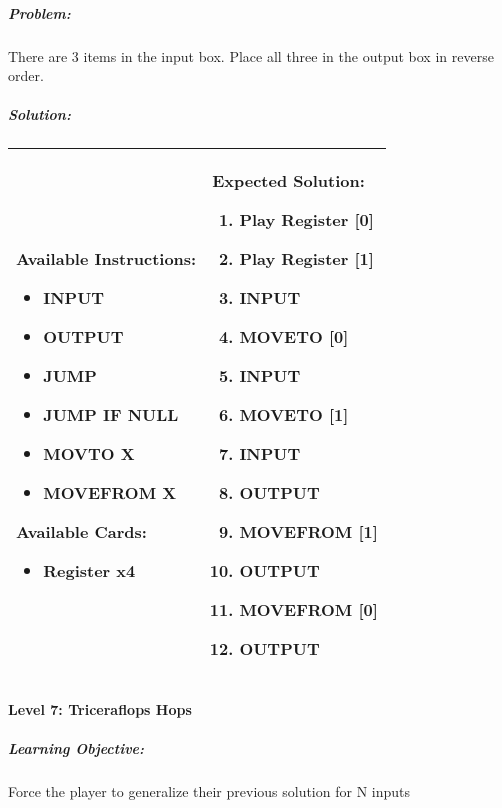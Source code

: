 \subparagraph{Problem:} There are 3 items in the input box. Place all three in the 
output box in reverse order.

\subparagraph{Solution:} 
\begin{center}
    \begin{tabular}{ | m{5cm} | m{9cm} | } 
        \hline
            \textbf{Available Instructions:} 
            \begin{itemize}
                \setlength\itemsep{-.35em}
                \item INPUT
                \item OUTPUT
                \item JUMP
                \item JUMP IF NULL
                \item MOVTO X
                \item MOVEFROM X
            \end{itemize}
            \textbf{Available Cards:} 
            \begin{itemize}
                \setlength\itemsep{-.35em}
                \item Register x4
            \end{itemize}& 
            \textbf{Expected Solution:} 
            \begin{enumerate}
                \setlength\itemsep{-.35em}
                \item Play Register [0]
                \item Play Register [1]
                \item INPUT
                \item MOVETO [0]
                \item INPUT
                \item MOVETO [1]
                \item INPUT
                \item OUTPUT
                \item MOVEFROM [1] 
                \item OUTPUT
                \item MOVEFROM [0] 
                \item OUTPUT
            \end{enumerate}
            \\
        \hline
    \end{tabular}
\end{center}

\paragraph{Level 7: Triceraflops Hops}
\subparagraph{Learning Objective:} Force the player to generalize their previous 
solution for N inputs

